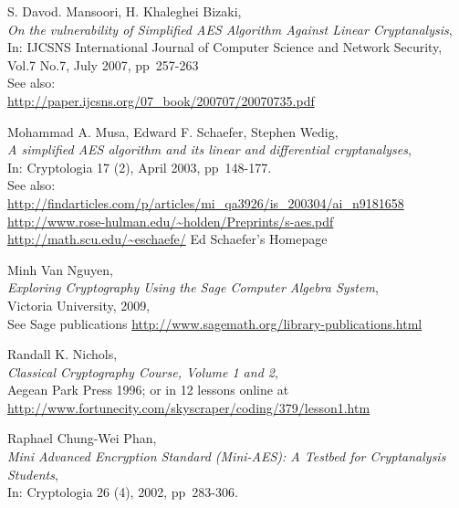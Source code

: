 \begin{thebibliography}{99999}
  
       S. Davod. Mansoori, H. Khaleghei Bizaki, \\
       {\em On the vulnerability of Simplified AES Algorithm Against Linear Cryptanalysis}, \\
       In: IJCSNS International Journal of Computer Science and Network Security, Vol.7 No.7,
           July 2007, pp~257-263 \\
       See also:\\
       \url{http://paper.ijcsns.org/07_book/200707/20070735.pdf}

  
       Mohammad A. Musa, Edward F. Schaefer, Stephen Wedig, \\
       {\em A simplified AES algorithm and its linear and differential cryptanalyses}, \\
       In: Cryptologia 17 (2), April 2003, pp~148-177.\\
       See also:\\
       \url{http://findarticles.com/p/articles/mi_qa3926/is_200304/ai_n9181658}\\
       \url{http://www.rose-hulman.edu/~holden/Preprints/s-aes.pdf}\\
       \url{http://math.scu.edu/~eschaefe/}   Ed Schaefer's Homepage

  
       Minh Van Nguyen, \\
       {\em Exploring Cryptography Using the Sage Computer Algebra System}, \\
       Victoria University, 2009, \\
       See Sage publications
       \url{http://www.sagemath.org/library-publications.html}

  
       Randall K. Nichols, \\
       {\em Classical Cryptography Course, Volume 1 and 2}, \\
       Aegean Park Press 1996;
       or in 12 lessons online at \\
       \url{http://www.fortunecity.com/skyscraper/coding/379/lesson1.htm}

  
       Raphael Chung-Wei Phan, \\
       {\em Mini Advanced Encryption Standard (Mini-AES): A Testbed for
            Cryptanalysis Students}, \\
       In: Cryptologia 26 (4), 2002, pp~283-306.


\end{thebibliography}

